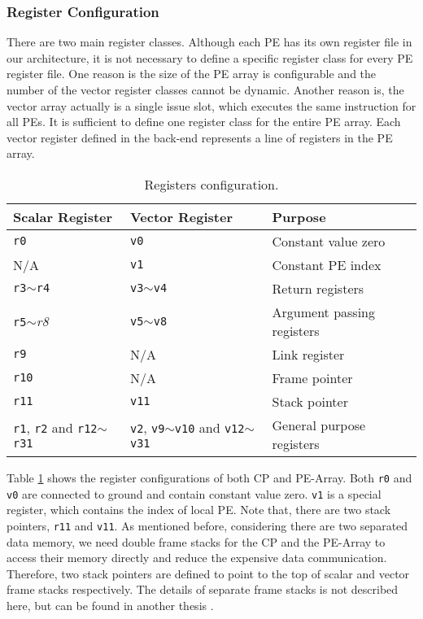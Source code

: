 \subsubsection{Register Configuration}
There are two main register classes. Although each PE has its own register file in our architecture, it is not necessary to define a specific register class for every PE register file. One reason is the size of the PE array is configurable and the number of the vector register classes cannot be dynamic. Another reason is, the vector array actually is a single issue slot, which executes the same instruction for all PEs. It is sufficient to define one register class for the entire PE array. Each vector register defined in the back-end represents a line of registers in the PE array.

\begin{table}[H]
\caption{Registers configuration.}
\begin{center}
\begin{tabular}{@{}l l l@{}}
\toprule
\textbf{Scalar Register} & \textbf{Vector Register} & \textbf{Purpose} \\ \hline
\texttt{r0} & \texttt{v0} & Constant value zero \\
N/A & \texttt{v1} & Constant PE index \\
\texttt{r3}$\sim$\texttt{r4}  & \texttt{v3}$\sim$\texttt{v4} & Return registers \\
\texttt{r5}$\sim$\emph{r8} & \texttt{v5}$\sim$\texttt{v8} & Argument passing registers \\
\texttt{r9} & N/A & Link register \\ 
\texttt{r10} & N/A & Frame pointer \\
\texttt{r11} & \texttt{v11} & Stack pointer \\
\texttt{r1}, \texttt{r2} and \texttt{r12}$\sim$\texttt{r31} & \texttt{v2}, \texttt{v9}$\sim$\texttt{v10} and \texttt{v12}$\sim$\texttt{v31} & General purpose registers \\
\bottomrule
\end{tabular}
\end{center}
\label{table:register_conf}
\end{table}%

Table \ref{table:register_conf} shows the register configurations of both CP and PE-Array.
Both \texttt{r0} and \texttt{v0} are connected to ground and contain constant value zero. \texttt{v1} is a special register, which contains the index of local PE. Note that, there are two stack pointers, \texttt{r11} and \texttt{v11}. As mentioned before, considering there are two separated data memory, we need double frame stacks for the CP and the PE-Array to access their memory directly and reduce the expensive data communication. Therefore, two stack pointers are defined to point to the top of scalar and vector frame stacks respectively. The details of separate frame stacks is not described here, but can be found in another thesis \cite[Chapter~4]{liu_zhenyuan}.

